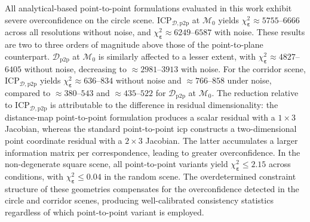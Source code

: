 All analytical-based point-to-point formulations evaluated in this work
exhibit severe overconfidence on the circle scene.
$\mathrm{ICP}_{\mathcal{D},\mathrm{p2p}}$ at $\mathcal{M}_0$
yields $\chi_{\boldsymbol{\varepsilon}}^2 \approx 5755$--$6666$ across all resolutions without noise,
and $\chi_{\boldsymbol{\varepsilon}}^2 \approx 6249$--$6587$ with noise. These results are two to
three orders of magnitude above those of the point-to-plane counterpart.
$\mathcal{D}_\mathrm{p2p}$ at $\mathcal{M}_0$ is similarly affected to a lesser
extent, with $\chi_{\boldsymbol{\varepsilon}}^2 \approx 4827$--$6405$ without noise, decreasing to
$\approx 2981$--$3913$ with noise.
For the corridor scene, $\mathrm{ICP}_{\mathcal{D},\mathrm{p2p}}$ yields
$\chi_{\boldsymbol{\varepsilon}}^2 \approx 636$--$834$ without noise and $\approx 766$--$858$ under noise,
compared to $\approx 380$--$543$ and $\approx 435$--$522$ for
$\mathcal{D}_\mathrm{p2p}$ at $\mathcal{M}_0$.
The reduction relative to $\mathrm{ICP}_{\mathcal{D},\mathrm{p2p}}$ is
attributable to the difference in residual dimensionality: the distance-map
point-to-point formulation produces a scalar residual with a
$1 \times 3$ Jacobian, whereas the standard point-to-point \gls{icp} constructs
a two-dimensional point coordinate residual with a $2 \times 3$ Jacobian. The
latter accumulates a larger information matrix per correspondence, leading to
greater overconfidence.
In the non-degenerate square scene, all point-to-point variants yield
$\chi_{\boldsymbol{\varepsilon}}^2 \leq 2.15$ across conditions,
with $\chi_{\boldsymbol{\varepsilon}}^2 \leq 0.04$ in the random scene.
The overdetermined constraint structure of these geometries
compensates for the overconfidence detected in the circle and corridor scenes,
producing well-calibrated consistency statistics regardless of
which point-to-point variant is employed.

